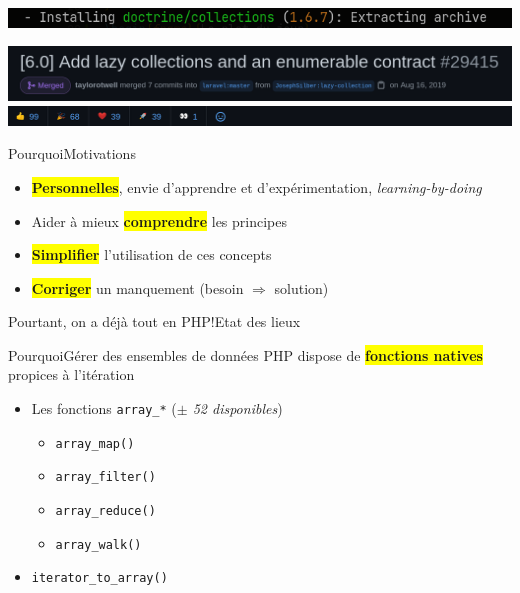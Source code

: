 \begin{frame}
    \includegraphics[width=\textwidth]{screenshots/Screenshot_20210520_104535.png}
\end{frame}

\begin{frame}
    \includegraphics[width=\textwidth]{screenshots/Screenshot_20210520_101402.png}
    \includegraphics[width=\textwidth]{screenshots/Screenshot_20210520_101458.png}
\end{frame}

\begin{frame}{Pourquoi}{Motivations}
    \begin{itemize}[<+->]
        \item \colorbox{yellow}{\textbf{Personnelles}}, envie d'apprendre et d'expérimentation, \textit{learning-by-doing}
        \item Aider à mieux \colorbox{yellow}{\textbf{comprendre}} les principes
        \item \colorbox{yellow}{\textbf{Simplifier}} l'utilisation de ces concepts
        \item \colorbox{yellow}{\textbf{Corriger}} un manquement (besoin $\Rightarrow$ solution)
    \end{itemize}
\end{frame}

\begin{frameC}{Pourtant, on a déjà tout en PHP!}{Etat des lieux}

\end{frameC}

\begin{frame}{Pourquoi}{Gérer des ensembles de données}
    PHP dispose de \colorbox{yellow}{\textbf{fonctions natives}} propices à l'itération

    \pause

    \begin{itemize}[<+->]
        \item Les fonctions \texttt{array\_*} (\textit{$\pm$ 52 disponibles})

        \begin{itemize}
            \item \texttt{array\_map()}
            \item \texttt{array\_filter()}
            \item \texttt{array\_reduce()}
            \item \texttt{array\_walk()}
        \end{itemize}
    \item \texttt{iterator\_to\_array()}
    \end{itemize}
\end{frame}

